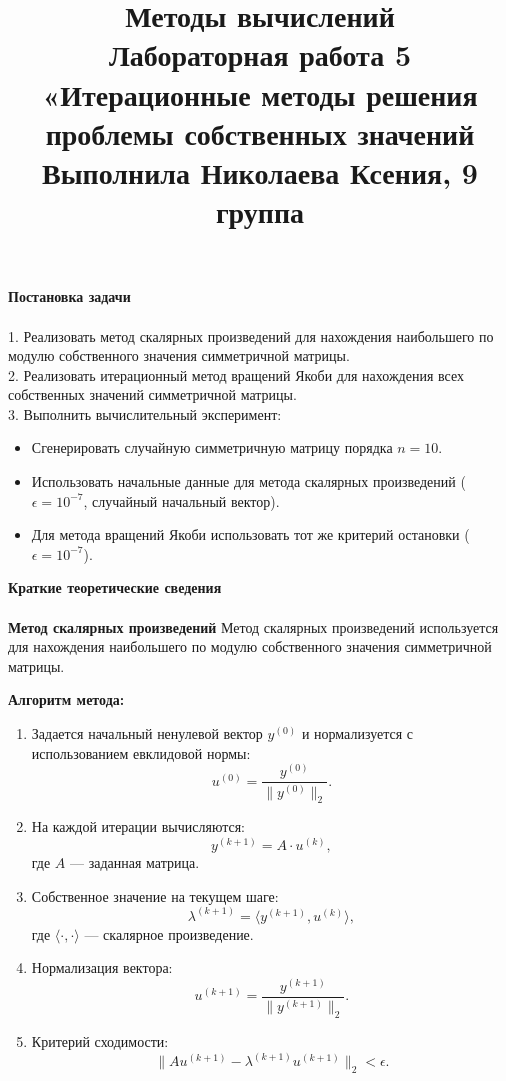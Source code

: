 \documentclass[a4paper, 12pt]{report}
\title{\textbf{\Huge{Методы вычислений}}\\Лабораторная работа 5\\«Итерационные методы решения проблемы собственных значений\\Выполнила Николаева Ксения, 9 группа}
\date{}
\begin{document}
    \maketitle

    \textbf{\Huge{Постановка задачи}}\\\\
1. Реализовать метод скалярных произведений для нахождения наибольшего по модулю собственного значения симметричной матрицы.  \\
2. Реализовать итерационный метод вращений Якоби для нахождения всех собственных значений симметричной матрицы.  \\
3. Выполнить вычислительный эксперимент:  
   \begin{itemize}
       \item Сгенерировать случайную симметричную матрицу порядка $n = 10$.
       \item Использовать начальные данные для метода скалярных произведений ($\epsilon = 10^{-7}$, случайный начальный вектор).
       \item Для метода вращений Якоби использовать тот же критерий остановки ($\epsilon = 10^{-7}$).
   \end{itemize}
\newpage
\textbf{\Huge{Краткие теоретические сведения}}\\\\
\textbf{Метод скалярных произведений}
Метод скалярных произведений используется для нахождения наибольшего по модулю собственного значения симметричной матрицы.  

\textbf{Алгоритм метода:}  
\begin{enumerate}
    \item Задается начальный ненулевой вектор $y^{(0)}$ и нормализуется с использованием евклидовой нормы:
    \[
    u^{(0)} = \frac{y^{(0)}}{\|y^{(0)}\|_2}.
    \]
    \item На каждой итерации вычисляются:
    \[
    y^{(k+1)} = A \cdot u^{(k)},
    \]
    где $A$ — заданная матрица.
    \item Собственное значение на текущем шаге:
    \[
    \lambda^{(k+1)} = \langle y^{(k+1)}, u^{(k)} \rangle,
    \]
    где $\langle \cdot, \cdot \rangle$ — скалярное произведение.
    \item Нормализация вектора:
    \[
    u^{(k+1)} = \frac{y^{(k+1)}}{\|y^{(k+1)}\|_2}.
    \]
    \item Критерий сходимости:
    \[
    \|A u^{(k+1)} - \lambda^{(k+1)} u^{(k+1)}\|_2 < \epsilon.
    \]
\end{enumerate}
\end{document}
